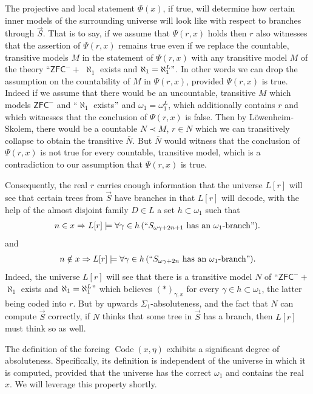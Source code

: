 \documentclass[a4paper,11pt]{article}
\newcommand{\ZFCminus}{\mathsf{ZFC}^{-}}
\begin{document}
 The projective and local statement $\Phi(x)$, if true,  will determine how certain inner models of the surrounding universe will look like with respect to branches through $\vec{S}$.
That is to say, if we assume that $\Psi(r,x) $ holds then $r$ also witnesses that the assertion of $\Psi(r,x)$ remains true even if we replace the  countable, transitive models $M$ in the statement of $\Psi (r,x)$ with any transitive  model $M$ of  the theory ``$\ZFCminus +$ $\aleph_1$ exists and $\aleph_1= \aleph_1^L"$. In other words  we can drop the assumption on the countability of $M$ in $\Psi (r,x)$, provided $\Psi(r,x)$ is true.
Indeed if we assume 
that there would be an uncountable, transitive $M$ which models $\ZFCminus$ and ``$
\aleph_1$ exists$"$ and $\omega_1= \omega_1^L$, which additionally contains $r$ and which witnesses that the conclusion of $\Psi(r,x)$ is false. Then by L\"owenheim-Skolem, there would be a countable $N\prec M$, $r\in N$ which we can transitively collapse to obtain the transitive $\bar{N}$. But $\bar{N}$ would witness that the conclusion of $\Psi(r,x)$ is not true for every countable, transitive model, which is a contradiction to our assumption that $\Psi(r,x)$ is true. 

Consequently, the real $r$ carries enough information that
the universe $L[r]$ will see that certain trees from $\vec{S}$ have branches in that $L[r]$ will decode, with the help of the almost disjoint family $D \in L$ a set $h \subset \omega_1$ such that
\begin{align*}
n \in x \Rightarrow L[r] \models  \forall \gamma \in h \, (``S_{\omega \gamma + 2n+1} \text{ has an $\omega_1$-branch}").
\end{align*}
and
\begin{align*}
n \notin x \Rightarrow L[r] \models \forall \gamma \in h \, ( ``S_{\omega \gamma + 2n} \text{ has an $\omega_1$-branch}").
\end{align*}
Indeed, the universe $L[r]$ will see that there is a transitive model $N$ of ``$\ZFCminus+$ $\aleph_1$ exists and $\aleph_1=\aleph_1^L"$ which believes $(\ast)_{\gamma,x}$ for every $\gamma \in h \subset \omega_1$, the latter being coded into $r$. But by upwards $\Sigma_1$-absoluteness, and the fact that $N$ can compute $\vec{S}$ correctly, if $N$ thinks that some tree in $\vec{S}$ has a branch, then $L[r]$ must think so as well. 


The definition of the forcing $\operatorname{Code}(x,\eta)$ exhibits a significant degree of absoluteness.  Specifically, its definition is independent of the universe in which it is computed, provided that the universe has the correct $\omega_1$ and contains the real $x$.  We will leverage this property shortly.
\end{document}
